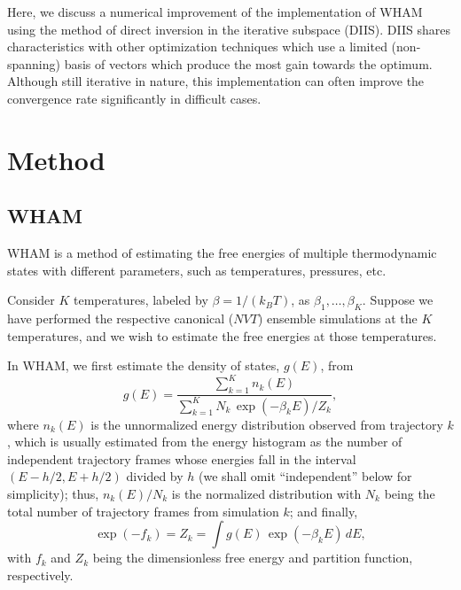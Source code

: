 \documentclass[reprint,aip,jcp,superscriptaddress]{revtex4-1}
\begin{document}
Here, we discuss a numerical improvement of
the implementation of WHAM using
the method of direct inversion in the iterative subspace (DIIS)\cite{
pulay1980, *pulay1982, *hamilton1986,
kovalenko1999, howard2011}.
%
DIIS shares characteristics with other optimization techniques which use a limited (non-spanning) basis of vectors which produce the most gain towards the optimum.
%
Although still iterative in nature,
this implementation
can often improve
the convergence rate
significantly in difficult cases.





\section{Method}





\subsection{WHAM}



WHAM is a method of
estimating the free energies
of multiple thermodynamic states
with different parameters,
such as temperatures, pressures, etc.
%




Consider $K$ temperatures,
labeled by
$\beta = 1/(k_B T)$,
as
$\beta_1, \ldots, \beta_K$.
%
Suppose we have performed the respective
canonical ($NVT$) ensemble simulations
at the $K$ temperatures, and
we wish to estimate the free energies
at those temperatures.



In WHAM,
we first estimate the density of states, $g(E)$, from
%
\begin{equation}
g(E)
=
\frac{
  \sum_{k = 1}^K n_k(E)
}
{
  \sum_{k = 1}^K N_k \, \exp(-\beta_k E) / Z_k
},
\label{eq:gE_WHAM}
\end{equation}
%
where
$n_k(E)$
is
the unnormalized energy distribution
observed from trajectory $k$,
which
is usually estimated
from the energy histogram as
the number of independent trajectory frames
whose energies fall in the interval
$(E - h/2, E + h/2)$
divided by $h$
(we shall omit ``independent'' below for simplicity);
%
{
thus, $n_k(E)/N_k$
is the normalized distribution
with $N_k$ being
the total number of trajectory frames
from simulation $k$;
}
%
and finally,
%
\begin{equation}
\exp( - f_k )
=
Z_k
=
\int g(E) \, \exp(-\beta_k E) \, dE,
\label{eq:Z}
\end{equation}
with
$f_k$
and
$Z_k$
being
the dimensionless free energy
and
partition function,
respectively.
\end{document}

